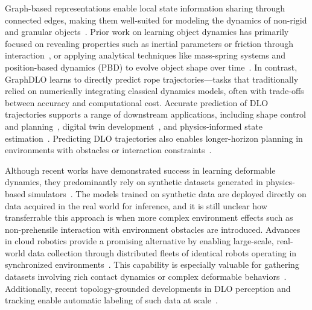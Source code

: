\documentclass[letterpaper, 10 pt, conference]{IEEETran}
\begin{document}
Graph-based representations enable local state information sharing through connected edges, making them well-suited for modeling the dynamics of non-rigid and granular objects~\cite{li2019learning, zhang2024adaptigraph, longhini2024clothsplatting, gu2025learning}. Prior work on learning object dynamics has primarily focused on revealing properties such as inertial parameters or friction through interaction~\cite{xu2019densephysnet, bianchini2023}, or applying analytical techniques like mass-spring systems and position-based dynamics (PBD) to evolve object shape over time~\cite{lloyd2007identification, macklin2014pbd, bender2015position, yin2021domanipulation}. In contrast, GraphDLO learns to directly predict rope trajectories—tasks that traditionally relied on numerically integrating classical dynamics models, often with trade-offs between accuracy and computational cost. Accurate prediction of DLO trajectories supports a range of downstream applications, including shape control and planning~\cite{moll2006path, yu2023shapecontrol, yu2022shapecontrol, yu2023generalizable, gu2025learning}, digital twin development~\cite{jiang2025phystwin, abou2025real}, and physics-informed state estimation~\cite{schulman2013deformable, tang2017state, longhini2024clothsplatting, abouchakra2024physically, zhang2024dynamic}. Predicting DLO trajectories also enables longer-horizon planning in environments with obstacles or interaction constraints~\cite{mitrano2021learning, huang2023deformable}.

Although recent works have demonstrated success in learning deformable dynamics, they predominantly rely on synthetic datasets generated in physics-based simulators~\cite{hu2019taichi, hu2019difftaichi, macklin2014pbd, macklin2022warp}. The models trained on synthetic data are deployed directly on data acquired in the real world for inference, and it is still unclear how transferrable this approach is when more complex environment effects such as non-prehensile interaction with environment obstacles are introduced. Advances in cloud robotics provide a promising alternative by enabling large-scale, real-world data collection through distributed fleets of identical robots operating in synchronized environments~\cite{zahid2024cloudgripper}. This capability is especially valuable for gathering datasets involving rich contact dynamics or complex deformable behaviors~\cite{hoque2022learning, brohan2022rt, jin2024pushing, ahn2024autort}. Additionally, recent topology-grounded developments in DLO perception and tracking enable automatic labeling of such data at scale~\cite{keipour2022efficient, xiang2023trackdlo}.
\end{document}

